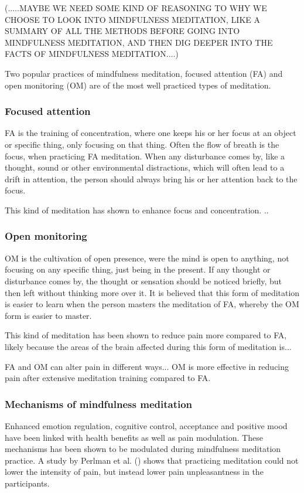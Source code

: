 (.....MAYBE WE NEED SOME KIND OF REASONING TO WHY WE CHOOSE TO LOOK INTO MINDFULNESS MEDITATION, LIKE A SUMMARY OF ALL THE METHODS BEFORE GOING INTO MINDFULNESS MEDITATION, AND THEN DIG DEEPER INTO THE FACTS OF MINDFULNESS MEDITATION....)



Two popular practices of mindfulness meditation, focused attention (FA) and open monitoring (OM) are of the most well practiced types of meditation. \cite{Zeidan2016}

\subsubsection{Focused attention} 
FA is the training of concentration, where one keeps his or her focus at an object or specific thing, only focusing on that thing. Often the flow of breath is the focus, when practicing FA meditation.  When any disturbance comes by, like a thought, sound or other environmental distractions, which will often lead to a drift in attention, the person should always bring his or her attention back to the focus. \cite{Zeidan2016}

This kind of meditation has shown to enhance focus and concentration. ..

\subsubsection{Open monitoring}
OM is the cultivation of open presence, were the mind is open to anything, not focusing on any specific thing, just being in the present. If any thought or disturbance comes by, the thought or sensation should be noticed briefly, but then left without thinking more over it. It is believed that this form of meditation is easier to learn when the person masters the meditation of FA, whereby the OM form is easier to master. \cite{Zeidan2016}

This kind of meditation has been shown to reduce pain more compared to FA, likely because the areas of the brain affected during this form of meditation is...\cite{Perlman2010}

FA and OM can alter pain in different ways...
OM is more effective in reducing pain after extensive meditation training compared to FA. 
\cite{Varilly2012}

\subsubsection{Mechanisms of mindfulness meditation}
Enhanced emotion regulation, cognitive control, acceptance and positive mood have been linked with health benefits as well as pain modulation. These mechanisms has been shown to be modulated during mindfulness meditation practice.
A study by Perlman et al. (\cite{Perlman2010}) shows that practicing meditation could not lower the intensity of pain, but instead lower pain unpleasantness in the participants. \cite{Zeidan2012, Perlman2010}

